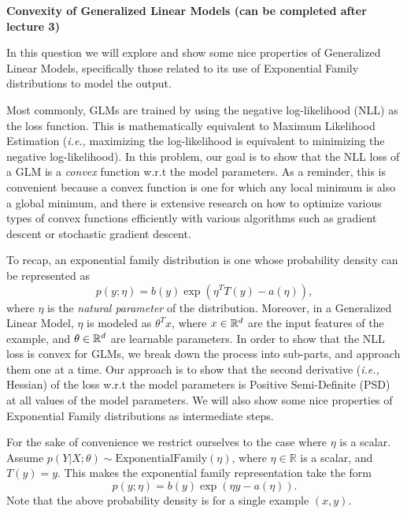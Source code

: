 \item {} {\bf Convexity of Generalized Linear Models (can be completed after lecture 3)}

In this question we will explore and show some nice properties of Generalized
Linear Models, specifically those related to its use of Exponential Family
distributions to model the output.

Most commonly, GLMs are trained by using the negative log-likelihood (NLL) as
the loss function. This is mathematically equivalent to Maximum Likelihood
Estimation (\emph{i.e.,} maximizing the log-likelihood is equivalent to
minimizing the negative log-likelihood). In this problem, our goal is to show
that the NLL loss of a GLM is a \textit{convex} function w.r.t the model parameters. As
a reminder, this is convenient because a convex function is one for which any
local minimum is also a global minimum, and there is extensive research on how
to optimize various types of convex functions efficiently with various algorithms
such as gradient descent or stochastic gradient descent. 

To recap, an exponential family distribution is one whose probability density
can be represented as
%
\begin{equation*}
    p(y; \eta) = b(y)\exp(\eta^TT(y) - a(\eta)),
\end{equation*}
%
where $\eta$ is the \emph{natural parameter} of the distribution. Moreover, in
a Generalized Linear Model, $\eta$ is modeled as $\theta^Tx$, where $x \in
\mathbb{R}^{d}$ are the input features of the example, and $\theta \in
\mathbb{R}^{d}$ are learnable parameters. In order to show that the NLL loss is
convex for GLMs, we break down the process into sub-parts, and approach them
one at a time. Our approach is to show that the second derivative (\emph{i.e.,}
Hessian) of the loss w.r.t the model parameters is Positive Semi-Definite (PSD)
at all values of the model parameters. We will also show some nice properties
of Exponential Family distributions as intermediate steps.

For the sake of convenience we restrict ourselves to the case where $\eta$ is
a scalar. Assume $p(Y|X;\theta )\sim \text{ExponentialFamily}(\eta)$, where
$\eta \in\mathbb{R}$ is a scalar, and $T(y) = y$. This makes the exponential
family representation take the form
%
\begin{equation*}
    p(y ; \eta) = b(y)\exp(\eta y - a(\eta)).
\end{equation*}
%
Note that the above probability density is for a single example $(x,y).$


